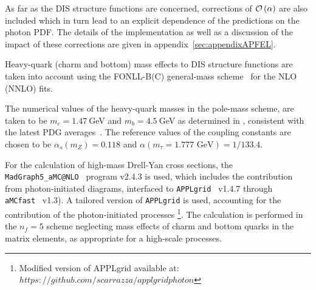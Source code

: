 As far as the DIS structure functions are concerned, corrections of
$\mathcal{O}\left( \alpha\right)$ are also included which in turn lead to an
explicit dependence of the predictions on the photon PDF.  The details
of the implementation as well as a discussion of the impact of these
corrections are given in appendix~\ref{sec:appendixAPFEL}.

Heavy-quark (charm and bottom) mass effects to DIS structure functions
are taken into account using the FONLL-B(C) general-mass
scheme~\cite{Forte:2010ta} for the NLO (NNLO) fits.

The numerical values of the heavy-quark masses in the pole-mass
scheme, are taken to be $m_c=1.47~$GeV and $m_b=4.5~$GeV as determined in \cite{Abramowicz:2015mha},  
consistent with the latest PDG averages~\cite{Agashe:2014kda}.
%
The reference values of the coupling constants are chosen to be
$\alpha_s(m_Z)=0.118$ and $\alpha(m_\tau=1.777\mbox{ GeV})=1/133.4$.

For the calculation of high-mass Drell-Yan cross sections, the
{\tt MadGraph5{\_}aMC@NLO}~\cite{Alwall:2014hca} program v2.4.3 is used, which
includes the contribution from photon-initiated diagrams, interfaced
to {\tt APPLgrid}~\cite{Carli:2010rw} v1.4.7 through {\tt
  aMCfast}~\cite{amcfast} v1.3).
%
A tailored version of {\tt APPLgrid} is used, accounting for
the contribution of the photon-initiated processes \footnote{Modified version of APPLgrid available at: $https://github.com/scarrazza/applgridphoton$}.
%
The calculation is performed in the $n_f=5$ scheme neglecting mass
effects of charm and bottom quarks in the matrix elements, as
appropriate for a high-scale processes.

